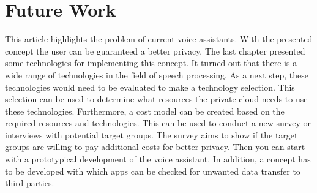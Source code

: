 \section{Future Work}
This article highlights the problem of current voice assistants. With the presented concept the user can be guaranteed a better privacy. The last chapter presented some technologies for implementing this concept. It turned out that there is a wide range of technologies in the field of speech processing. As a next step, these technologies would need to be evaluated to make a technology selection. This selection can be used to determine what resources the private cloud needs to use these technologies. Furthermore, a cost model can be created based on the required resources and technologies. This can be used to conduct a new survey or interviews with potential target groups. The survey aims to show if the target groups are willing to pay additional costs for better privacy. Then you can start with a prototypical development of the voice assistant. In addition, a concept has to be developed with which apps can be checked for unwanted data transfer to third parties.
